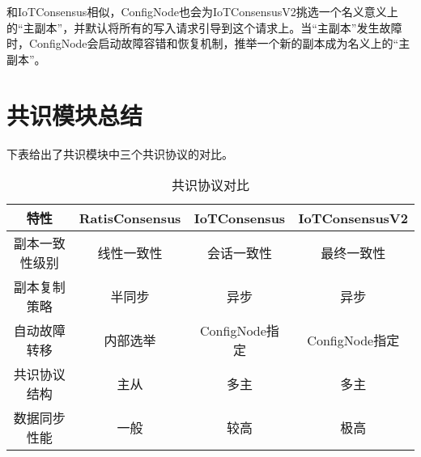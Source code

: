 和IoTConsensus相似，ConfigNode也会为IoTConsensusV2挑选一个名义意义上的“主副本”，并默认将所有的写入请求引导到这个请求上。当“主副本”发生故障时，ConfigNode会启动故障容错和恢复机制，推举一个新的副本成为名义上的“主副本”。


\section{共识模块总结}

下表给出了共识模块中三个共识协议的对比。

\begin{table}
    \centering
    \caption{共识协议对比}
    \begin{tabular}{cccc}
      \toprule
      特性         & RatisConsensus & IoTConsensus &  IoTConsensusV2 \\
      \midrule
      副本一致性级别   & 线性一致性 & 会话一致性 &  最终一致性 \\
       副本复制策略    & 半同步    & 异步       & 异步       \\
       自动故障转移    &  内部选举    &   ConfigNode指定    &  ConfigNode指定  \\ 
      共识协议结构   & 主从 & 多主 &  多主  \\
      数据同步性能   & 一般 & 较高 &  极高  \\
      \bottomrule
    \end{tabular}
    \label{tab:consensus-compare}
  \end{table}




